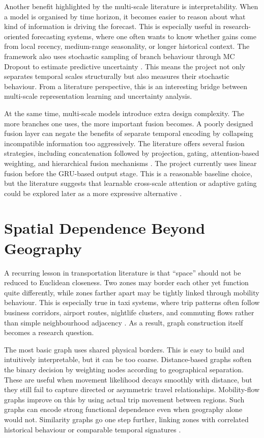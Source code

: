 \documentclass[12pt,a4paper]{report}
\begin{document}
Another benefit highlighted by the multi-scale literature is interpretability. When a model is organised by time horizon, it becomes easier to reason about what kind of information is driving the forecast. This is especially useful in research-oriented forecasting systems, where one often wants to know whether gains come from local recency, medium-range seasonality, or longer historical context. The framework also uses stochastic sampling of branch behaviour through MC Dropout to estimate predictive uncertainty \cite{gal2016dropout}. This means the project not only separates temporal scales structurally but also measures their stochastic behaviour. From a literature perspective, this is an interesting bridge between multi-scale representation learning and uncertainty analysis.

At the same time, multi-scale models introduce extra design complexity. The more branches one uses, the more important fusion becomes. A poorly designed fusion layer can negate the benefits of separate temporal encoding by collapsing incompatible information too aggressively. The literature offers several fusion strategies, including concatenation followed by projection, gating, attention-based weighting, and hierarchical fusion mechanisms \cite{lim2021survey,lim2021tft,ling2024msrgcn}. The project currently uses linear fusion before the GRU-based output stage. This is a reasonable baseline choice, but the literature suggests that learnable cross-scale attention or adaptive gating could be explored later as a more expressive alternative \cite{lim2021tft,ling2024msrgcn}.

\section{Spatial Dependence Beyond Geography}

A recurring lesson in transportation literature is that ``space'' should not be reduced to Euclidean closeness. Two zones may border each other yet function quite differently, while zones farther apart may be tightly linked through mobility behaviour. This is especially true in taxi systems, where trip patterns often follow business corridors, airport routes, nightlife clusters, and commuting flows rather than simple neighbourhood adjacency \cite{jiang2022survey,Rong_2024}. As a result, graph construction itself becomes a research question.



The most basic graph uses shared physical borders. This is easy to build and intuitively interpretable, but it can be too coarse. Distance-based graphs soften the binary decision by weighting nodes according to geographical separation. These are useful when movement likelihood decays smoothly with distance, but they still fail to capture directed or asymmetric travel relationships. Mobility-flow graphs improve on this by using actual trip movement between regions. Such graphs can encode strong functional dependence even when geography alone would not. Similarity graphs go one step further, linking zones with correlated historical behaviour or comparable temporal signatures \cite{ke2021od,jiang2022survey}.
\end{document}
